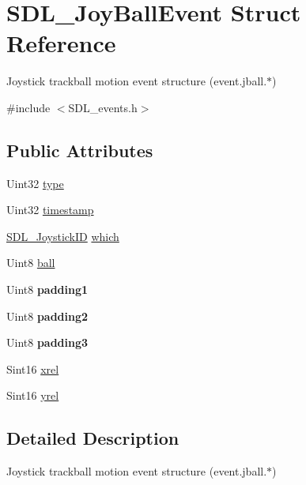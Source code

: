 \hypertarget{structSDL__JoyBallEvent}{}\section{S\+D\+L\+\_\+\+Joy\+Ball\+Event Struct Reference}
\label{structSDL__JoyBallEvent}


Joystick trackball motion event structure (event.\+jball.$\ast$)  




{\ttfamily \#include $<$S\+D\+L\+\_\+events.\+h$>$}

\subsection*{Public Attributes}
\begin{DoxyCompactItemize}
\item 
Uint32 \hyperlink{structSDL__JoyBallEvent_a0b192b95a043cb494b27ed9b27e84db1}{type}
\item 
Uint32 \hyperlink{structSDL__JoyBallEvent_aa8e4fb91af62e316bb9a3219ab76148d}{timestamp}
\item 
\hyperlink{SDL__joystick_8h_a3c3d32500cb08f76ee8077983912c0bd}{S\+D\+L\+\_\+\+Joystick\+ID} \hyperlink{structSDL__JoyBallEvent_a4e2e185717d529167cd0bea21093c454}{which}
\item 
Uint8 \hyperlink{structSDL__JoyBallEvent_add4eb0daeaf95ae56e8c7cfcec560242}{ball}
\item 
\mbox{\label{structSDL__JoyBallEvent_aff75a6519ca2a19cffdc14ebf4626613}} 
Uint8 {\bfseries padding1}
\item 
\mbox{\label{structSDL__JoyBallEvent_a0ea3071b99ac096b0157714f01ff04f8}} 
Uint8 {\bfseries padding2}
\item 
\mbox{\label{structSDL__JoyBallEvent_acb700712f1a4070bc114ef9d55b00640}} 
Uint8 {\bfseries padding3}
\item 
Sint16 \hyperlink{structSDL__JoyBallEvent_a959a8473aa1964e5e1778c27a9ffd261}{xrel}
\item 
Sint16 \hyperlink{structSDL__JoyBallEvent_a28ad48a9eb7a5d3ff62ccba09fcead76}{yrel}
\end{DoxyCompactItemize}


\subsection{Detailed Description}
Joystick trackball motion event structure (event.\+jball.$\ast$) 

